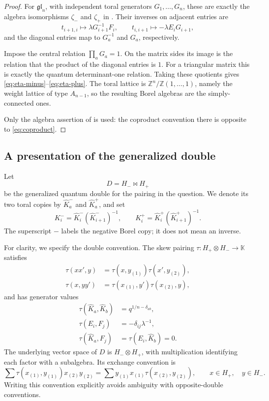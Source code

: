 \documentclass[11pt]{article}
\theoremstyle{remark}
\newcommand{\kk}{\mathbb{K}}
\begin{document}
\begin{proof}
For $\mathfrak{gl}_n$, with independent toral generators
$G_1,\ldots,G_n$, these are exactly the algebra isomorphisms
$\zeta_-$ and $\zeta_+$ in \cite[Section~2.4]{Gav}.
Their inverses on adjacent entries are
\[
 t_{i+1,i}\longmapsto\lambda G_{i+1}^{-1}F_i,
 \qquad
 t_{i,i+1}\longmapsto-\lambda E_iG_{i+1},
\]
and the diagonal entries map to $G_a^{-1}$ and $G_a$,
respectively.

Impose the central relation $\prod_aG_a=1$.
On the matrix sides its image is the relation that the product
of the diagonal entries is $1$.  For a triangular matrix this is
exactly the quantum determinant-one relation.  Taking these
quotients gives \eqref{eq:eta-minus}--\eqref{eq:eta-plus}.
The toral lattice is
$\mathbb Z^n/\mathbb Z(1,\ldots,1)$, namely the weight lattice of
type $A_{n-1}$, so the resulting Borel algebras are the
simply-connected ones.

Only the algebra assertion of \cite[Section~2.4]{Gav} is used:
the coproduct convention there is opposite to
\eqref{eq:coproduct}.
\end{proof}


\subsection{A presentation of the generalized double}

Let
\[
 D=H_-\bowtie H_+
\]
be the generalized quantum double for the pairing in the question.
We denote its two toral copies by $\widehat K_a^-$ and
$\widehat K_a^+$, and set
\[
 K_i^-=\widehat K_i^-(\widehat K_{i+1}^-)^{-1},
 \qquad
 K_i^+=\widehat K_i^+(\widehat K_{i+1}^+)^{-1}.
\]
The superscript $-$ labels the negative Borel copy; it does not
mean an inverse.

For clarity, we specify the double convention.  The skew pairing
$\tau:H_+\otimes H_-\to\kk$ satisfies
\[
 \begin{split}
 \tau(xx',y)&=\tau(x,y_{(1)})\tau(x',y_{(2)}),\\
 \tau(x,yy')&=\tau(x_{(1)},y')\tau(x_{(2)},y),
 \end{split}
\]
and has generator values
\begin{equation}\label{eq:pairing}
 \begin{split}
 \tau(\widehat K_a,\widehat K_b)&=q^{1/n-\delta_{ab}},\\
 \tau(E_i,F_j)&=-\delta_{ij}\lambda^{-1},\\
 \tau(\widehat K_a,F_j)&=\tau(E_i,\widehat K_b)=0.
 \end{split}
\end{equation}
The underlying vector space of $D$ is $H_-\otimes H_+$, with
multiplication identifying each factor with a subalgebra.  Its
exchange convention is
\begin{equation}\label{eq:double-exchange}
 \sum\tau(x_{(1)},y_{(1)})x_{(2)}y_{(2)}
 =
 \sum y_{(1)}x_{(1)}\tau(x_{(2)},y_{(2)}),
 \qquad x\in H_+,\quad y\in H_-.
\end{equation}
Writing this convention explicitly avoids ambiguity with
opposite-double conventions.
\end{document}
